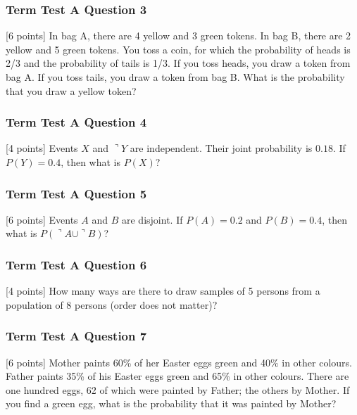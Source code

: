 \documentclass[xcolor=dvipsnames]{beamer}
\begin{document}
\begin{frame}
  \frametitle{Term Test A Question 3}
[6 points] In bag A, there are 4 yellow and 3 green tokens. In bag
B, there are 2 yellow and 5 green tokens. You toss a coin, for which
the probability of heads is 2/3 and the probability of tails is 1/3.
If you toss heads, you draw a token from bag A. If you toss tails, you
draw a token from bag B. What is the probability that you draw a
yellow token?
\end{frame}

\begin{frame}
  \frametitle{Term Test A Question 4}
[4 points] Events $X$ and $\urcorner{}Y$ are independent. Their joint
probability is $0.18$. If $P(Y)=0.4$, then what is $P(X)$?
\end{frame}

\begin{frame}
  \frametitle{Term Test A Question 5}
[6 points] Events $A$ and $B$ are disjoint. If $P(A)=0.2$ and $P(B)=0.4$,
then what is $P(\urcorner{}A\cup\urcorner{}B)$?
\end{frame}

\begin{frame}
  \frametitle{Term Test A Question 6}
[4 points] How many ways are there to draw samples of 5 persons from a
population of 8 persons (order does not matter)?
\end{frame}

\begin{frame}
  \frametitle{Term Test A Question 7}
[6 points] Mother paints 60\% of her Easter eggs green and 40\% in other
colours. Father paints 35\% of his Easter eggs green and 65\% in other
colours. There are one hundred eggs, 62 of which were painted by
Father; the others by Mother. If you find a green egg, what is the
probability that it was painted by Mother?
\end{frame}
\end{document}
